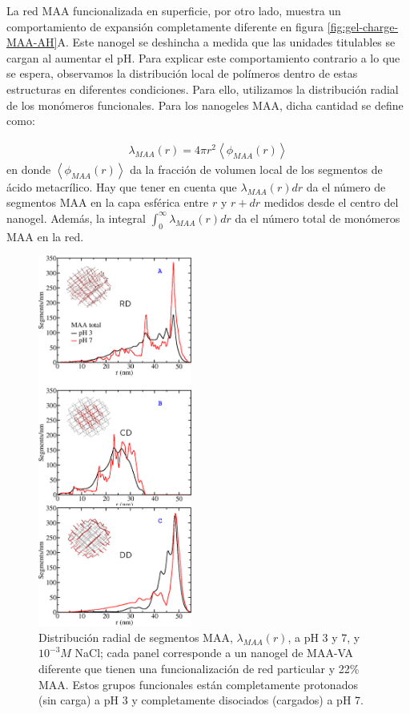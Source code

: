 La red MAA funcionalizada en superficie, por otro lado, muestra un comportamiento de expansi\'on completamente diferente en figura \ref{fig:gel-charge-MAA-AH}A.
Este nanogel se deshincha a medida que las unidades titulables se cargan al aumentar el pH.
Para explicar este comportamiento contrario a lo que se espera, observamos la distribuci\'on local de pol\'imeros dentro de estas estructuras en diferentes condiciones.
Para ello, utilizamos la distribuci\'on radial de los mon\'omeros funcionales.
Para los nanogeles MAA, dicha cantidad se define como:

%
\begin{align}
    \lambda_{MAA}(r)= 4\pi r^2\left<\phi_{MAA}(r)\right>
\end{align}
%
\noindent en donde $\left<\phi_{MAA}(r)\right>$ da la fracci\'on de volumen local de los segmentos de \'acido metacr\'ilico.
Hay que tener en cuenta que $\lambda_{MAA}(r) dr$ da el n\'umero de segmentos MAA en la capa esf\'erica entre $r$ y $r+dr$ medidos desde el centro del nanogel.
Adem\'as, la integral $\int_0^\infty \lambda_{MAA}(r) dr$ da el n\'umero total de mon\'omeros MAA en la red.


\begin{figure}[!htb]
     \centering
     \includegraphics[width=0.45\textwidth]{Figures/graphs-gel2/dist-MAA.png}
     \caption{Distribuci\'on radial de segmentos MAA, $\lambda_{MAA}(r)$, a pH 3 y 7, y $10^{-3}M$ NaCl; cada panel corresponde a un nanogel de  MAA-VA diferente que tienen una funcionalizaci\'on de red particular y 22\% MAA.
     	Estos grupos funcionales est\'an completamente protonados (sin carga) a pH 3 y completamente disociados (cargados) a pH 7.}
     \label{fig:MAA-vs-r-distribution}
 \end{figure}


